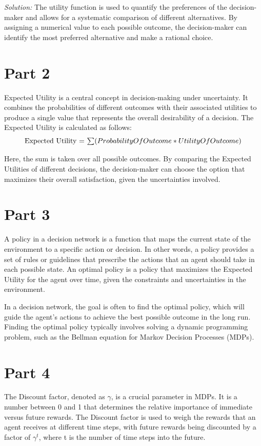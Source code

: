 \documentclass[a4paper, 11pt]{article}
\newenvironment{solution}
    {\textit{Solution:}}
    {}
\begin{document}
{\begin{solution}
The utility function is used to quantify the preferences of the decision-maker and allows for a systematic comparison of different alternatives. By assigning a numerical value to each possible outcome, the decision-maker can identify the most preferred alternative and make a rational choice.
	\section*{\small Part 2}
Expected Utility is a central concept in decision-making under uncertainty. It combines the probabilities of different outcomes with their associated utilities to produce a single value that represents the overall desirability of a decision. The Expected Utility is calculated as follows:
\begin{equation}
	$Expected Utility = $\sum(Probability Of Outcome * Utility Of Outcome)$$$$$$$$
\end{equation}

Here, the sum is taken over all possible outcomes. By comparing the Expected Utilities of different decisions, the decision-maker can choose the option that maximizes their overall satisfaction, given the uncertainties involved.
	\section*{\small Part 3}
A policy in a decision network is a function that maps the current state of the environment to a specific action or decision. In other words, a policy provides a set of rules or guidelines that prescribe the actions that an agent should take in each possible state. An optimal policy is a policy that maximizes the Expected Utility for the agent over time, given the constraints and uncertainties in the environment.

In a decision network, the goal is often to find the optimal policy, which will guide the agent's actions to achieve the best possible outcome in the long run. Finding the optimal policy typically involves solving a dynamic programming problem, such as the Bellman equation for Markov Decision Processes (MDPs).
\section*{\small Part 4}
The Discount factor, denoted as $\gamma$, is a crucial parameter in MDPs. It is a number between 0 and 1 that determines the relative importance of immediate versus future rewards. The Discount factor is used to weigh the rewards that an agent receives at different time steps, with future rewards being discounted by a factor of $\gamma^t$, where t is the number of time steps into the future.


\end{solution}}
\end{document}
